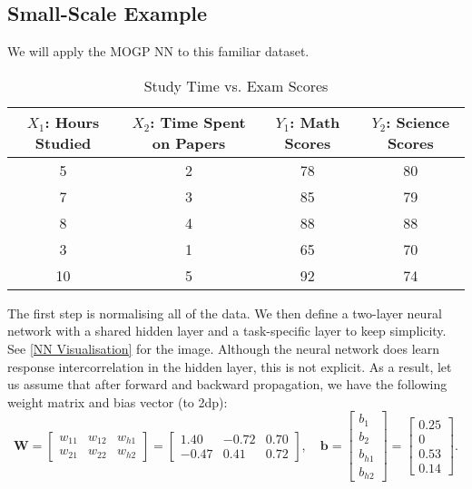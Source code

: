 \subsection{Small-Scale Example}
We will apply the MOGP NN to this familiar dataset.
\setlength{\tabcolsep}{4pt} %
\begin{table}[H]
    \centering
    \begin{tabular}{|c|c|c|c|}
        \hline
        \( X_1 \): Hours Studied & \( X_2 \): Time Spent on Papers & \( Y_1 \): Math Scores & \( Y_2 \): Science Scores\\
        \hline
        5  & 2  & 78 & 80 \\
        7  & 3  & 85 & 79 \\
        8  & 4  & 88 & 88 \\
        3  & 1  & 65 & 70 \\
        10 & 5  & 92 & 74 \\
        \hline
    \end{tabular}
    \caption{Study Time vs. Exam Scores}
    \label{tab:study_scores7}
\end{table}
\noindent The first step is normalising all of the data.
We then define a two-layer neural network with a shared hidden layer and a task-specific layer to keep simplicity. See \ref{NN Visualisation} for the image. Although the neural network does learn response intercorrelation in the hidden layer, this is not explicit. As a result, let us assume that after forward and backward propagation, we have the following weight matrix and bias vector (to 2dp):
\[
\mathbf{W} =\begin{bmatrix}
    w_{11} & w_{12} & w_{h1} \\
    w_{21} & w_{22} & w_{h2}
\end{bmatrix}=\begin{bmatrix}
    1.40 & -0.72 & 0.70 \\
    -0.47 & 0.41 & 0.72
\end{bmatrix}, \quad \mathbf{b}=\begin{bmatrix}
   b_1 \\
    b_2\\
    b_{h1}\\
    b_{h2}
\end{bmatrix}=\begin{bmatrix}
   0.25 \\
    0\\
    0.53\\
    0.14
\end{bmatrix}.
\]
